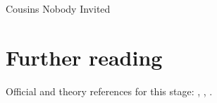 \begin{ledger}{Cousins Nobody Invited}
\end{ledger}

\section{Further reading}
\label{sec:uninvited_cousins:further_reading}
Official and theory references for this stage: \cite{Sjostrand:1987su}, \cite{CMS:2019csb}, \cite{CMS:2015wcf}.

\begin{pitfalls}
\end{pitfalls}

\begin{exercises}
\item {}
\item {}
\end{exercises}
